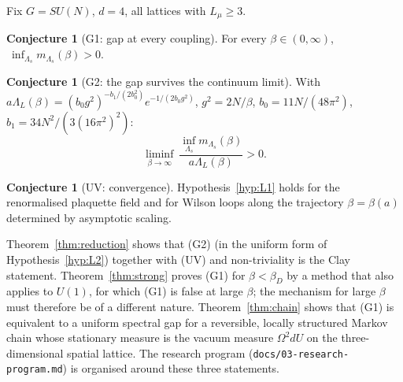 \documentclass[11pt,a4paper]{article}
\theoremstyle{definition}
\newtheorem{conjecture}[theorem]{Conjecture}
\theoremstyle{remark}
\begin{document}
Fix $G=SU(N)$, $d=4$, all lattices with $L_\mu\ge3$.

\begin{conjecture}[G1: gap at every coupling]
For every $\beta\in(0,\infty)$, $\ \inf_{\Lambda_s}m_{\Lambda_s}(\beta)>0$.
\end{conjecture}

\begin{conjecture}[G2: the gap survives the continuum limit]
With $a\Lambda_L(\beta)=(b_0g^2)^{-b_1/(2b_0^2)}e^{-1/(2b_0g^2)}$, $g^2=2N/\beta$, $b_0=11N/(48\pi^2)$,
$b_1=34N^2/(3(16\pi^2)^2)$:
\[
\liminf_{\beta\to\infty}\ \frac{\inf_{\Lambda_s}m_{\Lambda_s}(\beta)}{a\Lambda_L(\beta)}>0 .
\]
\end{conjecture}

\begin{conjecture}[UV: convergence]
Hypothesis~\ref{hyp:L1} holds for the renormalised plaquette field and for Wilson loops along the trajectory
$\beta=\beta(a)$ determined by asymptotic scaling.
\end{conjecture}

Theorem~\ref{thm:reduction} shows that (G2) (in the uniform form of Hypothesis~\ref{hyp:L2}) together with (UV) and
non-triviality is the Clay statement. Theorem~\ref{thm:strong} proves (G1) for $\beta<\beta_D$ by a method that also
applies to $U(1)$, for which (G1) is false at large $\beta$; the mechanism for large $\beta$ must therefore be of a
different nature. Theorem~\ref{thm:chain} shows that (G1) is equivalent to a uniform spectral gap for a reversible,
locally structured Markov chain whose stationary measure is the vacuum measure $\Omega^2dU$ on the three-dimensional
spatial lattice. The research program (\texttt{docs/03-research-program.md}) is organised around these three statements.
\end{document}
